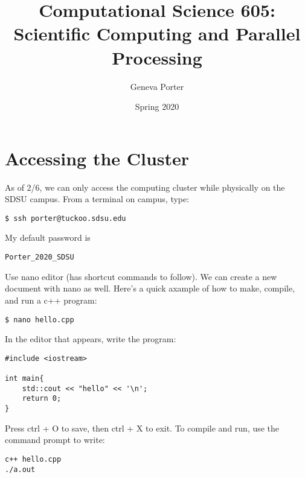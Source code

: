 \documentclass{article}
\title{Computational Science 605: \\ Scientific Computing and Parallel Processing}
\author{Geneva Porter}
\date{Spring 2020}
\begin{document}
\maketitle

\section{Accessing the Cluster}

As of 2/6, we can only access the computing cluster while physically on the SDSU campus. From a terminal on campus, type:

\begin{verbatim}
$ ssh porter@tuckoo.sdsu.edu
\end{verbatim}

\noindent My default password is 

\begin{verbatim}
Porter_2020_SDSU
\end{verbatim}

\noindent Use nano editor (has shortcut commands to follow). We can create a new document with nano as well. Here's a quick axample of how to make, compile, and run a c++ program:

\begin{verbatim}
$ nano hello.cpp
\end{verbatim}

\noindent In the editor that appears, write the program:

\begin{verbatim}
#include <iostream>

int main{
    std::cout << "hello" << '\n';
    return 0;
}
\end{verbatim}

\noindent Press ctrl + O to save, then ctrl + X to exit. To compile and run, use the command prompt to write:

\begin{verbatim}
c++ hello.cpp
./a.out
\end{verbatim}
\end{document}
